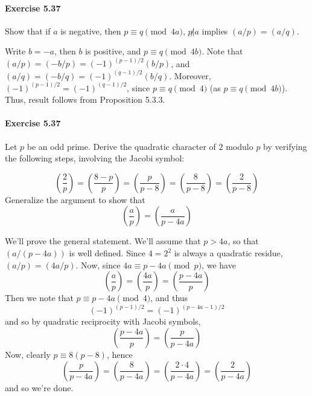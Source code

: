 \documentclass[notitlepage]{article}
\theoremstyle{definition}
\begin{document}
\paragraph{Exercise 5.37}
Show that if $a$ is negative, then $p \equiv q \pmod {4a}$, $p \not | a$ implies $(a/p) = (a/q)$.

Write $b = -a$, then $b$ is positive, and $p \equiv q \pmod {4b}$. Note that
$(a/p) = (-b/p) = (-1)^{(p-1)/2} (b/p)$, and $(a/q) = (-b/q) =
(-1)^{(q-1)/2} (b/q)$. Moreover, $(-1)^{(p-1)/2} = (-1)^{(q-1)/2}$,
since $p \equiv q  \pmod 4$ (as $p \equiv q \pmod {4b}$). Thus, result follows
from Proposition 5.3.3.

\paragraph{Exercise 5.37}
Let $p$ be an odd prime. Derive the quadratic character of $2$ modulo
$p$ by verifying the following steps, involving the Jacobi symbol:

\begin{equation}
  \left(\frac{2}{p}\right) = \left(\frac{8-p}{p}\right) =
  \left(\frac{p}{p-8}\right) = \left(\frac{8}{p-8}\right) =
  \left(\frac{2}{p-8}\right)
\end{equation}
Generalize the argument to show that
\begin{equation}
  \left(\frac{a}{p}\right) = \left(\frac{a}{p-4a}\right)
\end{equation}

We'll prove the general statement. We'll assume that $p > 4a$, so that
$(a/(p-4a))$ is well defined. Since $4 = 2^2$ is always a quadratic
residue, $(a/p) = (4a/p)$. Now, since $4a \equiv p-4a \pmod p$, we have
\begin{equation}
  \left(\frac{a}{p}\right) = \left(\frac{4a}{p}\right) =
  \left(\frac{p-4a}{p}\right)
\end{equation}
Then we note that $p \equiv p-4a  \pmod 4$, and thus
\begin{equation}
  (-1)^{(p-1)/2} = (-1)^{(p-4a-1)/2}
\end{equation}
and so by quadratic reciprocity with Jacobi symbols,
\begin{equation}
  \left(\frac{p-4a}{p}\right) = \left(\frac{p}{p-4a}\right)
\end{equation}
Now, clearly $p \equiv 8 (p-8)$, hence
\begin{equation}
\left(\frac{p}{p-4a}\right) = \left(\frac{8}{p-4a}\right) =
\left(\frac{2 \cdot 4}{p-4a}\right) = \left(\frac{2}{p-4a}\right)
\end{equation}
and so we're done.
\end{document}

